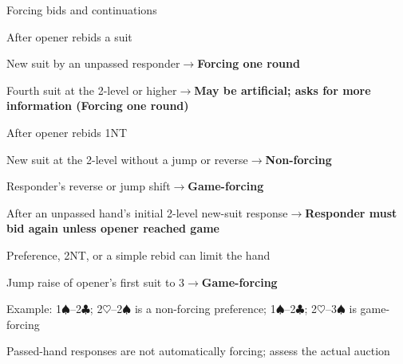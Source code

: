 \documentclass[10pt,letterpaper]{article}
\newcommand{\C}{\ensuremath{\clubsuit}}
\newcommand{\Hh}{\ensuremath{\heartsuit}}
\renewcommand{\S}{\ensuremath{\spadesuit}}
\begin{document}
\begin{minipage}[t]{0.485\textwidth}\vspace{0pt}

\begin{guidecard}{Forcing bids and continuations}
\begin{branches}
\item After opener rebids a suit
\begin{branches}
\item New suit by an unpassed responder\;\ensuremath{\longrightarrow}\;\textbf{Forcing one round}
\item Fourth suit at the 2-level or higher\;\ensuremath{\longrightarrow}\;\textbf{May be artificial; asks for more information (Forcing one round)}
\end{branches}
\item After opener rebids 1NT
\begin{branches}
\item New suit at the 2-level without a jump or reverse\;\ensuremath{\longrightarrow}\;\textbf{Non-forcing}
\item Responder's reverse or jump shift\;\ensuremath{\longrightarrow}\;\textbf{Game-forcing}
\end{branches}
\item After an unpassed hand's initial 2-level new-suit response\;\ensuremath{\longrightarrow}\;\textbf{Responder must bid again unless opener reached game}
\begin{branches}
\item Preference, 2NT, or a simple rebid can limit the hand
\item Jump raise of opener's first suit to 3\;\ensuremath{\longrightarrow}\;\textbf{Game-forcing}
\item Example: 1\S{}--2\C{}; 2\Hh{}--2\S{} is a non-forcing preference; 1\S{}--2\C{}; 2\Hh{}--3\S{} is game-forcing
\end{branches}
\item Passed-hand responses are not automatically forcing; assess the actual auction
\end{branches}
\end{guidecard}

\end{minipage}
\end{document}
